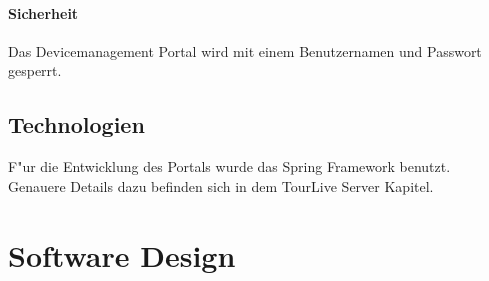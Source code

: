 \paragraph{Sicherheit}
Das Devicemanagement Portal wird mit einem Benutzernamen und Passwort gesperrt. 

\subsection*{Technologien}
F"{u}r die Entwicklung des Portals wurde das Spring Framework benutzt. Genauere Details dazu befinden sich in dem TourLive Server Kapitel.


\section{Software Design}

